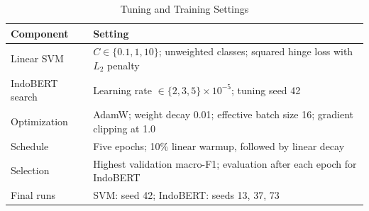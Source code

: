 \documentclass[conference]{IEEEtran}
\begin{document}
\begin{table}[!htbp]
\caption{Tuning and Training Settings}

\centering
\small
\renewcommand{\arraystretch}{1.35}
\setlength{\tabcolsep}{5pt}
\setlength{\arrayrulewidth}{0.4pt}
\begin{tabular}{|C{0.27\columnwidth}|C{0.63\columnwidth}|}
\hline
\textbf{Component} & \textbf{Setting} \\
\hline
Linear SVM & $C\in\{0.1,1,10\}$; unweighted classes; squared hinge loss with $L_2$ penalty \\
\hline
IndoBERT search & Learning rate $\in\{2,3,5\}\times10^{-5}$; tuning seed 42 \\
\hline
Optimization & AdamW; weight decay 0.01; effective batch size 16; gradient clipping at 1.0 \\
\hline
Schedule & Five epochs; 10\% linear warmup, followed by linear decay \\
\hline
Selection & Highest validation macro-F1; evaluation after each epoch for IndoBERT \\
\hline
Final runs & SVM: seed 42; IndoBERT: seeds 13, 37, 73 \\
\hline
\end{tabular}
\end{table}
\end{document}
